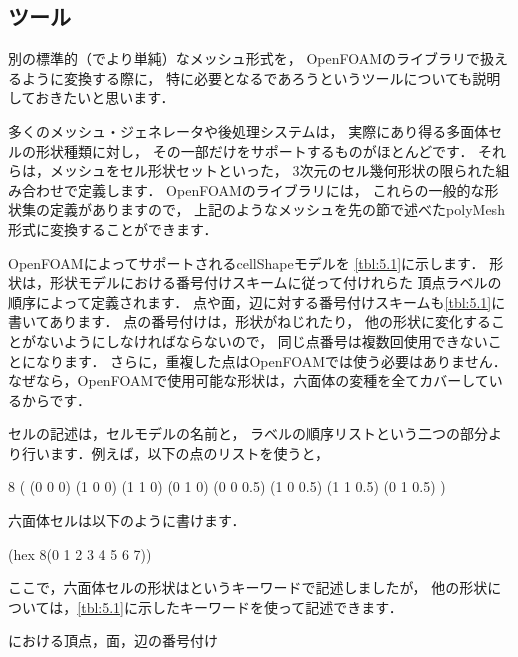 \subsection{ツール}
\label{ssec:5.1.3}
別の標準的（でより単純）なメッシュ形式を，
OpenFOAMのライブラリで扱えるように変換する際に，
特に必要となるであろうというツールについても説明しておきたいと思います．

多くのメッシュ・ジェネレータや後処理システムは，
実際にあり得る多面体セルの形状種類に対し，
その一部だけをサポートするものがほとんどです．
それらは，メッシュをセル形状セットといった，
3次元のセル幾何形状の限られた組み合わせで定義します．
OpenFOAMのライブラリには，
これらの一般的な形状集の定義がありますので，
上記のようなメッシュを先の節で述べたpolyMesh形式に変換することができます．

OpenFOAMによってサポートされるcellShapeモデルを
\autoref{tbl:5.1}に示します．
形状は，形状モデルにおける番号付けスキームに従って付けれらた
頂点ラベルの順序によって定義されます．
点や面，辺に対する番号付けスキームも\autoref{tbl:5.1}に書いてあります．
点の番号付けは，形状がねじれたり，
他の形状に変化することがないようにしなければならないので，
同じ点番号は複数回使用できないことになります．
さらに，重複した点はOpenFOAMでは使う必要はありません．
なぜなら，OpenFOAMで使用可能な形状は，六面体の変種を全てカバーしているからです．

セルの記述は，セルモデルの名前と，
ラベルの順序リストという二つの部分より行います．例えば，以下の点のリストを使うと，
\begin{OFverbatim}[file]
8
    (
        (0 0 0)
        (1 0 0)
        (1 1 0)
        (0 1 0)
        (0 0 0.5)
        (1 0 0.5)
        (1 1 0.5)
        (0 1 0.5)
    )
\end{OFverbatim}
六面体セルは以下のように書けます．
\begin{OFverbatim}[file]
(hex 8(0 1 2 3 4 5 6 7))
\end{OFverbatim}
ここで，六面体セルの形状はというキーワードで記述しましたが，
他の形状については，\autoref{tbl:5.1}に示したキーワードを使って記述できます．


\begin{table}[p]
 
 \caption{における頂点，面，辺の番号付け}
 \label{tbl:5.1}
\end{table}


